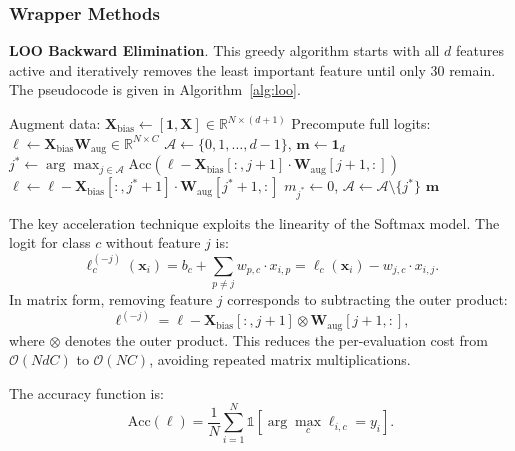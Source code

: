 \documentclass[onecolumn,a4paper,12pt]{IEEEtran}
\begin{document}
\subsubsection{Wrapper Methods}

\textbf{LOO Backward Elimination}. This greedy algorithm starts with all $d$ features active and iteratively removes the least important feature until only 30 remain. The pseudocode is given in Algorithm~\ref{alg:loo}.

\begin{algorithm}[htbp]
\caption{LOO Backward Elimination with Precomputed Logits}
\label{alg:loo}
\begin{algorithmic}[1]
\State Augment data: $\mathbf{X}_{\text{bias}} \leftarrow [\mathbf{1}, \mathbf{X}] \in \mathbb{R}^{N \times (d+1)}$
\State Precompute full logits: $\boldsymbol{\ell} \leftarrow \mathbf{X}_{\text{bias}} \mathbf{W}_{\text{aug}} \in \mathbb{R}^{N \times C}$
\State $\mathcal{A} \leftarrow \{0, 1, \dots, d-1\}$, $\mathbf{m} \leftarrow \mathbf{1}_d$
    \State $j^* \leftarrow \arg\max_{j \in \mathcal{A}} \text{Acc}(\boldsymbol{\ell} - \mathbf{X}_{\text{bias}}[:, j+1] \cdot \mathbf{W}_{\text{aug}}[j+1, :])$
    \State $\boldsymbol{\ell} \leftarrow \boldsymbol{\ell} - \mathbf{X}_{\text{bias}}[:, j^*+1] \cdot \mathbf{W}_{\text{aug}}[j^*+1, :]$ 
    \State $m_{j^*} \leftarrow 0$, $\mathcal{A} \leftarrow \mathcal{A} \setminus \{j^*\}$
\EndWhile
\State \Return $\mathbf{m}$
\end{algorithmic}
\end{algorithm}

The key acceleration technique exploits the linearity of the Softmax model. The logit for class $c$ without feature $j$ is:
\begin{equation}
\ell_c^{(-j)}(\mathbf{x}_i) = b_c + \sum_{p \neq j} w_{p,c} \cdot x_{i,p} = \ell_c(\mathbf{x}_i) - w_{j,c} \cdot x_{i,j}.
\end{equation}
In matrix form, removing feature $j$ corresponds to subtracting the outer product:
\begin{equation}
\boldsymbol{\ell}^{(-j)} = \boldsymbol{\ell} - \mathbf{X}_{\text{bias}}[:, j+1] \otimes \mathbf{W}_{\text{aug}}[j+1, :],
\end{equation}
where $\otimes$ denotes the outer product. This reduces the per-evaluation cost from $\mathcal{O}(NdC)$ to $\mathcal{O}(NC)$, avoiding repeated matrix multiplications.

The accuracy function is:
\begin{equation}
\text{Acc}(\boldsymbol{\ell}) = \frac{1}{N} \sum_{i=1}^{N} \mathbb{1}\left[\arg\max_{c} \ell_{i,c} = y_i\right].
\end{equation}
\end{document}
